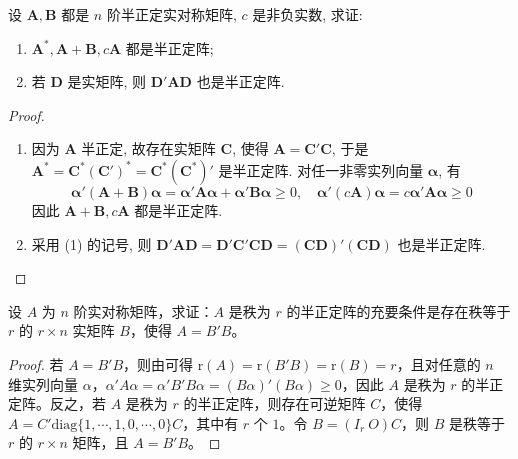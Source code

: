 \documentclass[../../main.tex]{subfiles}%
\begin{document}
\begin{proposition}\label{proposition:半正定阵的相关性质}
设 \(\boldsymbol{A},\boldsymbol{B}\) 都是 \(n\) 阶半正定实对称矩阵, \(c\) 是非负实数, 求证:
\begin{enumerate}[(1)]
\item \(\boldsymbol{A}^*,\boldsymbol{A}+\boldsymbol{B},c\boldsymbol{A}\) 都是半正定阵;
\item 若 \(\boldsymbol{D}\) 是实矩阵, 则 \(\boldsymbol{D}'\boldsymbol{A}\boldsymbol{D}\) 也是半正定阵.
\end{enumerate}
\end{proposition}
\begin{proof}
\begin{enumerate}[(1)]
\item 因为 \(\boldsymbol{A}\) 半正定, 故存在实矩阵 \(\boldsymbol{C}\), 使得 \(\boldsymbol{A}=\boldsymbol{C}'\boldsymbol{C}\), 于是 \(\boldsymbol{A}^*=\boldsymbol{C}^*(\boldsymbol{C}')^*=\boldsymbol{C}^*(\boldsymbol{C}^*)'\) 是半正定阵. 对任一非零实列向量 \(\boldsymbol{\alpha}\), 有
\[\boldsymbol{\alpha}'(\boldsymbol{A}+\boldsymbol{B})\boldsymbol{\alpha}=\boldsymbol{\alpha}'\boldsymbol{A}\boldsymbol{\alpha}+\boldsymbol{\alpha}'\boldsymbol{B}\boldsymbol{\alpha}\geqslant 0,\quad\boldsymbol{\alpha}'(c\boldsymbol{A})\boldsymbol{\alpha}=c\boldsymbol{\alpha}'\boldsymbol{A}\boldsymbol{\alpha}\geqslant 0\]
因此 \(\boldsymbol{A}+\boldsymbol{B},c\boldsymbol{A}\) 都是半正定阵.
\item 采用 (1) 的记号, 则 \(\boldsymbol{D}'\boldsymbol{A}\boldsymbol{D}=\boldsymbol{D}'\boldsymbol{C}'\boldsymbol{C}\boldsymbol{D}=(\boldsymbol{C}\boldsymbol{D})'(\boldsymbol{C}\boldsymbol{D})\) 也是半正定阵.
\end{enumerate} 

\end{proof}

\begin{proposition}\label{proposition:半正定阵的行满秩分解}
设 $A$ 为 $n$ 阶实对称矩阵，求证：$A$ 是秩为 $r$ 的半正定阵的充要条件是存在秩等于 $r$ 的 $r\times n$ 实矩阵 $B$，使得 $A = B'B$。 
\end{proposition}
\begin{proof}

若 $A = B'B$，则由可得 $\mathrm{r}(A)=\mathrm{r}(B'B)=\mathrm{r}(B)=r$，且对任意的 $n$ 维实列向量 $\alpha$，$\alpha'A\alpha=\alpha'B'B\alpha=(B\alpha)'(B\alpha)\geqslant 0$，因此 $A$ 是秩为 $r$ 的半正定阵。反之，若 $A$ 是秩为 $r$ 的半正定阵，则存在可逆矩阵 $C$，使得 $A = C'\mathrm{diag}\{1,\cdots,1,0,\cdots,0\}C$，其中有 $r$ 个 $1$。令 $B=(I_r\ O)C$，则 $B$ 是秩等于 $r$ 的 $r\times n$ 矩阵，且 $A = B'B$。 

\end{proof}
\end{document}
